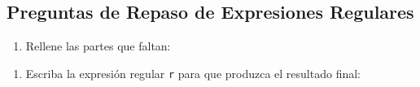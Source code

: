 \subsection{Preguntas de Repaso de Expresiones
Regulares}\label{preguntas-de-repaso-de-expresiones-regulares}

\begin{enumerate}
\def\labelenumi{\arabic{enumi}.}
\itemsep1pt\parskip0pt
\item
  Rellene las partes que faltan:
\end{enumerate}

\begin{Shaded}
\begin{Highlighting}[]
\FloatTok{(}\FloatTok{+)(}\FloatTok{)}
\FloatTok{(}\FloatTok{+)(}\FloatTok{)}
\NormalTok{[ ______, _____, ______, index: __, input: } \NormalTok{]}
\NormalTok{> }
\NormalTok{______}
\NormalTok{[ ______, _____, ______, index: __, input: } \NormalTok{]}
\NormalTok{> }
\NormalTok{______}
\NormalTok{[ ______, _____, ______, index: __, input: } \NormalTok{]}
\NormalTok{> }
\NormalTok{______}
\NormalTok{_____}
\end{Highlighting}
\end{Shaded}

\begin{enumerate}
\def\labelenumi{\arabic{enumi}.}
\setcounter{enumi}{1}
\itemsep1pt\parskip0pt
\item
  Escriba la expresión regular \texttt{r} para que produzca el resultado
  final:
\end{enumerate}

\begin{Shaded}
\begin{Highlighting}[]
\FloatTok{(}\OtherTok{___}\FloatTok{)}\OtherTok{/}
\NormalTok{[ } \NormalTok{]}
\end{Highlighting}
\end{Shaded}

